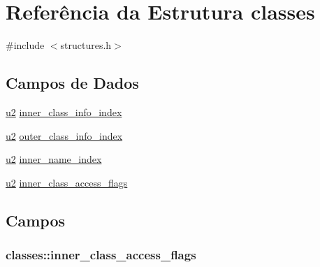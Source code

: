 \hypertarget{structclasses}{}\section{Referência da Estrutura classes}
\label{structclasses}


{\ttfamily \#include $<$structures.\+h$>$}

\subsection*{Campos de Dados}
\begin{DoxyCompactItemize}
\item 
\hyperlink{lista__operandos_8h_a732cde1300aafb73b0ea6c2558a7a54f}{u2} \hyperlink{structclasses_a0b0500d3d12c2572e38ec03f4eb018cd}{inner\+\_\+class\+\_\+info\+\_\+index}
\item 
\hyperlink{lista__operandos_8h_a732cde1300aafb73b0ea6c2558a7a54f}{u2} \hyperlink{structclasses_a0f25ecea2b18dfbcf23e4a6975eb1f21}{outer\+\_\+class\+\_\+info\+\_\+index}
\item 
\hyperlink{lista__operandos_8h_a732cde1300aafb73b0ea6c2558a7a54f}{u2} \hyperlink{structclasses_a8cdb61a61adc9fc0d99acc9be0915187}{inner\+\_\+name\+\_\+index}
\item 
\hyperlink{lista__operandos_8h_a732cde1300aafb73b0ea6c2558a7a54f}{u2} \hyperlink{structclasses_a493162e441680c04b835a3b31a371e5c}{inner\+\_\+class\+\_\+access\+\_\+flags}
\end{DoxyCompactItemize}


\subsection{Campos}
\subsubsection[{\texorpdfstring{inner\+\_\+class\+\_\+access\+\_\+flags}{inner_class_access_flags}}]{ classes\+::inner\+\_\+class\+\_\+access\+\_\+flags}\hypertarget{structclasses_a493162e441680c04b835a3b31a371e5c}{}\label{structclasses_a493162e441680c04b835a3b31a371e5c}
